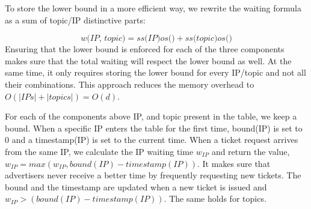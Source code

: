 To store the lower bound in a more efficient way, we rewrite the waiting formula as a sum of topic/IP distinctive parts:

\begin{equation}
    \textit{w(IP, topic)} = 
    \textit{ss(IP)}\textit{os()} + 
    \textit{ss(topic)}\textit{os()}
\end{equation}
Ensuring that the lower bound is enforced for each of the three components
makes sure that the total waiting will respect the lower bound as well. At the
same time, it only requires storing the lower bound for every IP/topic and not all their combinations. This approach reduces the memory overhead to $O(|IPs|+|topics|) = O(d)$.

For each of the components above IP, and topic present in the table, we
keep a bound. When a specific IP enters the table for the first time, bound(IP)
is set to 0 and a timestamp(IP) is set to the current time. When a ticket
request arrives from the same IP, we calculate the IP waiting time $w_{IP}$ and
return the value, $w_{IP} = max(w_{IP}, bound(IP) - timestamp(IP))$. It makes sure that advertisers never receive a better time by frequently requesting new tickets. The bound and the timestamp are updated when a new ticket is issued and $w_{IP} > (bound(IP) - timestamp(IP))$. The same holds for topics.


